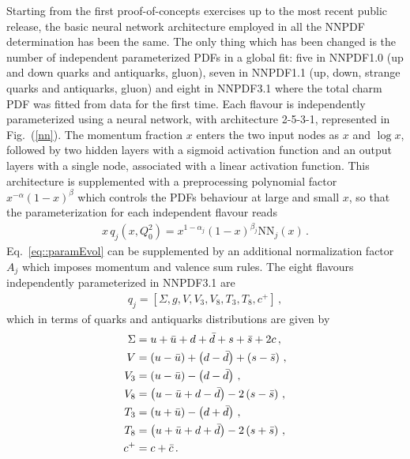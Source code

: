 %
Starting from the first proof-of-concepts exercises up to the most recent public release, the basic
neural network architecture employed in all the NNPDF determination has been the same.
The only thing which has been changed is the number of independent parameterized PDFs in a global fit:
five in NNPDF1.0 (up and down quarks and antiquarks, gluon), 
seven in NNPDF1.1 (up, down, strange quarks and antiquarks, gluon) and eight in NNPDF3.1
where the total charm PDF was fitted from data for the first time.
Each flavour is independently parameterized using a neural network,
with architecture 2-5-3-1, represented in Fig.~(\ref{nn}). 
The momentum fraction $x$ enters the two input nodes as $x$ and $\log{x}$, followed by two hidden layers with a sigmoid activation function and an output layers with a single node, 
associated with a linear activation function. 
This architecture is supplemented with a preprocessing polynomial factor $x^{-\alpha}\left(1-x\right)^{\beta}$ which controls the PDFs behaviour
at large and small $x$, so that the parameterization for each independent flavour reads
\begin{align}
	\label{eq::paramEvol}
	x\,q_j\left(x, Q_0^2\right) = x^{1-\alpha_{j}}\left(1-x\right)^{\beta_{j}}\text{NN}_{j}\left(x\right)\,.
\end{align}
Eq.~\eqref{eq::paramEvol} can be supplemented by an additional normalization factor $A_j$ which imposes momentum
and valence sum rules. The eight flavours independently parameterized in NNPDF3.1 are 
\begin{align}
    \label{eq:nnpdf31IC_basis}
    q_j = \left[\Sigma, g, V, V_3, V_8, T_3, T_8, c^+ \right]\,,
\end{align} 
which in terms of quarks and antiquarks distributions are given by
\begin{align}
    \Sigma  &=  u+\bar{u} + d+\bar{d} + s+\bar{s} + 2c  \, ,  \nonumber \\
    V     &= \left( u-\bar{u}\right) + \left( d-\bar{d}\right) + \left( s-\bar{s}\right)   \, ,\nonumber \\
    V_3     &=  \left( u-\bar{u}\right) - \left(  d-\bar{d}  \right) \, , \nonumber\\
    V_8     &=  \left( u-\bar{u} +  d-\bar{d}  \right) - 2\left( s-\bar{s} \right) \,,\\
    T_3     &=  \left( u+\bar{u}\right) - \left(  d+\bar{d}  \right) \, ,  \nonumber\\
    T_8     &=  \left( u+\bar{u} +  d+\bar{d}  \right) - 2\left( s+\bar{s} \right) \, , \nonumber\\
    c^+ &= c +\bar{c}\,. \nonumber
  \end{align}

